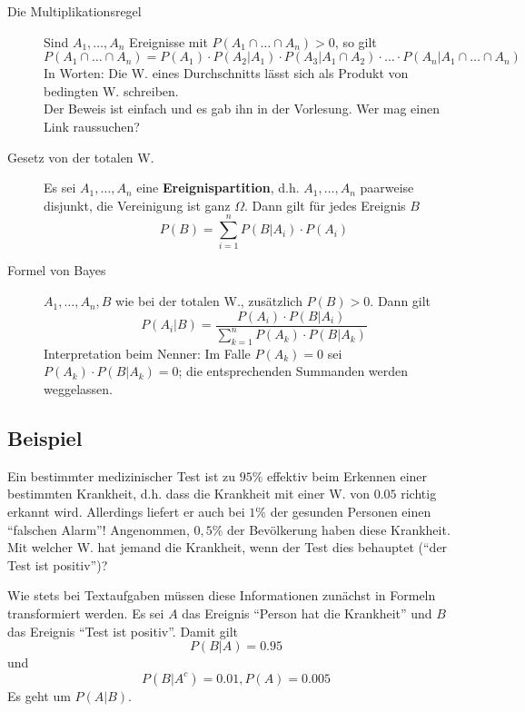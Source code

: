\begin{description}
	\item[Die Multiplikationsregel] Sind $A_1,\ldots,A_n$ Ereignisse mit $P(A_1\cap\ldots\cap A_n)>0$, so gilt
		\begin{equation}
			P(A_1\cap\ldots\cap A_n) = P(A_1)\cdot P(A_2|A_1) \cdot P(A_3|A_1 \cap A_2) \cdot \ldots \cdot P(A_n|A_1\cap\ldots\cap A_n)
		\end{equation}
		In Worten: Die W. eines Durchschnitts lässt sich als Produkt von bedingten W. schreiben.\\
		Der Beweis ist einfach und es gab ihn in der Vorlesung. Wer mag einen Link raussuchen?
	\item[Gesetz von der totalen W.] Es sei $A_1,\ldots,A_n$ eine \textbf{Ereignispartition}, d.h. %
		$A_1,\ldots,A_n$ paarweise disjunkt, die Vereinigung ist ganz $\Omega$. Dann gilt für jedes Ereignis $B$
		\begin{equation}
			P(B) = \sum_{i=1}^n P(B|A_i)\cdot P(A_i)
		\end{equation}
	\item[Formel von Bayes] $A_1,\ldots,A_n,B$ wie bei der totalen W., zusätzlich $P(B)>0$. Dann gilt
		\begin{equation}
			\label{def:bayes}
			P(A_i|B) = \frac{P(A_i)\cdot P(B|A_i)}{\sum_{k=1}^n P(A_k)\cdot P(B|A_k)}
		\end{equation}
		Interpretation beim Nenner: Im Falle $P(A_k)=0$ sei $P(A_k)\cdot P(B|A_k) = 0$; die entsprechenden Summanden werden weggelassen.
\end{description}

\subsection{Beispiel}

Ein bestimmter medizinischer Test ist zu $95\%$ effektiv beim Erkennen einer bestimmten Krankheit, d.h. dass die Krankheit mit einer W. von $0.05$ richtig erkannt wird. 
Allerdings liefert er auch bei $1\%$ der gesunden Personen einen ``falschen Alarm''!
Angenommen, $0,5\%$ der Bevölkerung haben diese Krankheit.
Mit welcher W. hat jemand die Krankheit, wenn der Test dies behauptet (``der Test ist positiv'')? 

Wie stets bei Textaufgaben müssen diese Informationen zunächst in Formeln transformiert werden. Es sei $A$ das Ereignis ``Person hat die Krankheit'' und $B$ das Ereignis ``Test ist positiv''. Damit gilt
\[P(B|A) = 0.95\] und
\[P(B|A^c) = 0.01, P(A) = 0.005\]
Es geht um $P(A|B)$.

